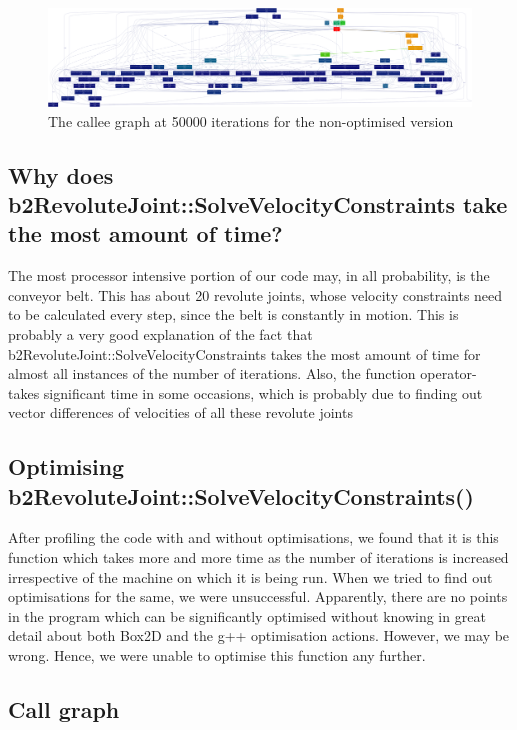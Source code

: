 \documentclass[a4paper,11pt]{article}
\begin{document}
	\begin{figure}[ht]
	\includegraphics[scale=0.042]{debug50000.png}
	\caption{The callee graph at 50000 iterations for the non-optimised version}
	\end{figure}

	\subsection{Why does b2RevoluteJoint::SolveVelocityConstraints take the most amount of time?}

The most processor intensive portion of our code may, in all probability, is the conveyor belt. This has about 20 revolute joints, whose velocity constraints need to be calculated every step, since the belt is constantly in motion. This is probably a very good explanation of the fact that b2RevoluteJoint::SolveVelocityConstraints takes the most amount of time for almost all instances of the number of iterations.
Also, the function operator- takes significant time in some occasions, which is probably due to finding out vector differences of velocities of all these revolute joints

	\subsection{Optimising b2RevoluteJoint::SolveVelocityConstraints()}

	After profiling the code with and without optimisations, we found that it is this function which takes more and more time as the number of iterations is increased irrespective of the machine on which it is being run. When we tried to find out optimisations for the same, we were unsuccessful. Apparently, there are no points in the program which can be significantly optimised without knowing in great detail about both Box2D and the g++ optimisation actions. However, we may be wrong. Hence, we were unable to optimise this function any further. 



	\subsection{Call graph}
\end{document}
